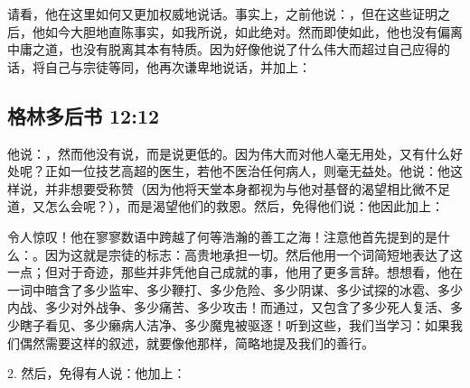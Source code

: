 请看，他在这里如何又更加权威地说话。事实上，之前他说：，但在这些证明之后，他如今大胆地直陈事实，如我所说，如此绝对。然而即使如此，他也没有偏离中庸之道，也没有脱离其本有特质。因为好像他说了什么伟大而超过自己应得的话，将自己与宗徒等同，他再次谦卑地说话，并加上：\par


\subsection{格林多后书 12:12}

\par

他说：，然而他没有说，而是说更低的。因为伟大而对他人毫无用处，又有什么好处呢？正如一位技艺高超的医生，若他不医治任何病人，则毫无益处。他说：他这样说，并非想要受称赞（因为他将天堂本身都视为与他对基督的渴望相比微不足道，又怎么会呢？），而是渴望他们的救恩。然后，免得他们说：他因此加上：\par

令人惊叹！他在寥寥数语中跨越了何等浩瀚的善工之海！注意他首先提到的是什么：。因为这就是宗徒的标志：高贵地承担一切。然后他用一个词简短地表达了这一点；但对于奇迹，那些并非凭他自己成就的事，他用了更多言辞。想想看，他在一词中暗含了多少监牢、多少鞭打、多少危险、多少阴谋、多少试探的冰雹、多少内战、多少对外战争、多少痛苦、多少攻击！而通过，又包含了多少死人复活、多少瞎子看见、多少癞病人洁净、多少魔鬼被驱逐！听到这些，我们当学习：如果我们偶然需要这样的叙述，就要像他那样，简略地提及我们的善行。\par

2. 然后，免得有人说：他加上：\par



